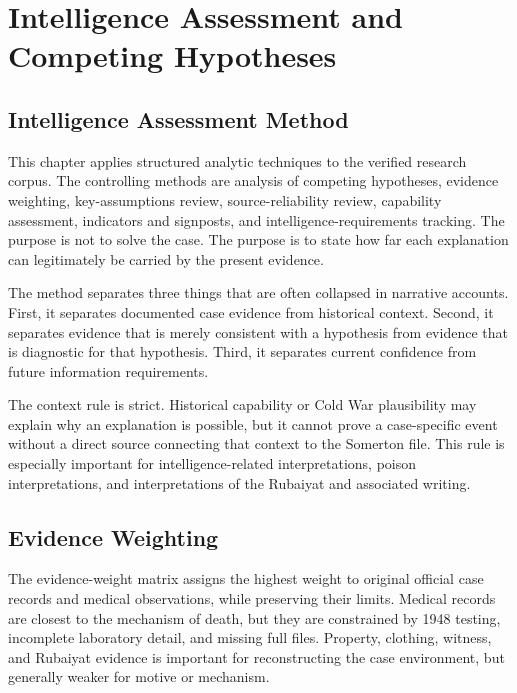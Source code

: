 \chapter{Intelligence Assessment and Competing Hypotheses}
\label{chap:intelligence-assessment-and-competing-hypotheses}


\section{Intelligence Assessment Method}

This chapter applies structured analytic techniques to the verified research corpus. The controlling methods are analysis of competing hypotheses, evidence weighting, key-assumptions review, source-reliability review, capability assessment, indicators and signposts, and intelligence-requirements tracking. The purpose is not to solve the case. The purpose is to state how far each explanation can legitimately be carried by the present evidence.

The method separates three things that are often collapsed in narrative accounts. First, it separates documented case evidence from historical context. Second, it separates evidence that is merely consistent with a hypothesis from evidence that is diagnostic for that hypothesis. Third, it separates current confidence from future information requirements.

The context rule is strict. Historical capability or Cold War plausibility may explain why an explanation is possible, but it cannot prove a case-specific event without a direct source connecting that context to the Somerton file. This rule is especially important for intelligence-related interpretations, poison interpretations, and interpretations of the Rubaiyat and associated writing.

\section{Evidence Weighting}

The evidence-weight matrix assigns the highest weight to original official case records and medical observations, while preserving their limits. Medical records are closest to the mechanism of death, but they are constrained by 1948 testing, incomplete laboratory detail, and missing full files. Property, clothing, witness, and Rubaiyat evidence is important for reconstructing the case environment, but generally weaker for motive or mechanism.


